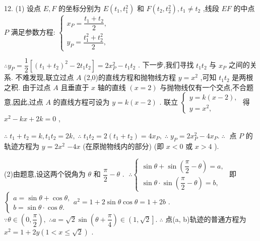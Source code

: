12. (1) 设点 $E,F$ 的坐标分别为 $E\left( {{t}_{1},{t}_{1}^{2}}\right)$ 和 $F\left( {{t}_{2},{t}_{2}^{2}}\right) ,{t}_{1} \neq  {t}_{2}$ ,线段 ${EF}$ 的中点 $P$ 满足参数方程: $\left\{  \begin{array}{l} {x}_{P} = \dfrac{{t}_{1} + {t}_{2}}{2}, \\  {y}_{P} = \dfrac{{t}_{1}^{2} + {t}_{2}^{2}}{2}, \end{array}\right.$

$\therefore {y}_{P} = \dfrac{1}{2}\left\lbrack  {{\left( {t}_{1} + {t}_{2}\right) }^{2} - 2{t}_{1}{t}_{2}}\right\rbrack   = 2{x}_{P}^{2} - {t}_{1}{t}_{2}$ . 下一步,我们寻找 ${t}_{1}{t}_{2}$ 与 ${x}_{P}$ 之间的关系. 不难发现,联立过点 $A$ (2,0)的直线方程和抛物线方程 $y = {x}^{2}$ ,可知 ${t}_{1}{t}_{2}$ 是两根之积. 由于过点 $A$ 且垂直于 $x$ 轴的直线 $\left( {x = 2}\right)$ 与抛物线仅有一个交点,不合题意,因此,过点 $A$ 的直线方程可设为 $y = k\left( {x - 2}\right)$ . 联立 $\left\{  \begin{array}{l} y = k\left( {x - 2}\right) , \\  y = {x}^{2}, \end{array}\right.$ 得 ${x}^{2} - {kx} + {2k} = 0$ ,

$\therefore \;{t}_{1} + {t}_{2} = k,{t}_{1}{t}_{2} = {2k},\;\therefore \;{t}_{1}{t}_{2} = 2\left( {{t}_{1} + {t}_{2}}\right)  = 4{x}_{P},\;\therefore \;{y}_{P} = 2{x}_{P}^{2} - 4{x}_{P}.\;\therefore \;$ 点 $P$ 的轨迹方程为 $y = 2{x}^{2}$  $- {4x}$ (在原抛物线内的部分) (即 $x < 0$ 或 $x > 4$ ).

(2)由题意,设这两个锐角为 $\theta$ 和 $\dfrac{\pi }{2} - \theta$ . $\;\therefore \left\{  \begin{array}{l} \sin \theta  + \sin \left( {\dfrac{\pi }{2} - \theta }\right)  = a, \\  \sin \theta  \cdot  \sin \left( {\dfrac{\pi }{2} - \theta }\right)  = b, \end{array}\right.$ 即 $\left\{  {\begin{array}{l} a = \sin \theta  + \cos \theta , \\  b = \sin \theta  \cdot  \cos \theta . \end{array}{a}^{2} = 1 + 2\sin \theta \cos \theta  = 1 + {2b}}\right.$ . $\because \theta  \in  \left( {0,\dfrac{\pi }{2}}\right) ,\;\therefore a = \sqrt{2}\sin \left( {\theta  + \dfrac{\pi }{4}}\right)  \in  \left( {1,\sqrt{2}}\right\rbrack  .\;\therefore$ 点(a, b)轨迹的普通方程为 ${x}^{2} = 1 + {2y}\left( {1 < x \leq  \sqrt{2}}\right)$ .

